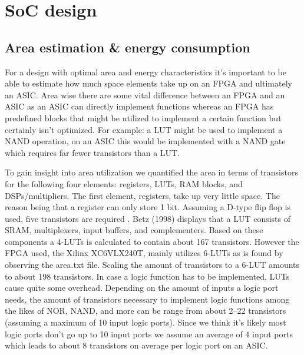 \section{SoC design}
\subsection{Area estimation \& energy consumption}
For a design with optimal area and energy characteristics it's important to be able to estimate how much space elements take up on an FPGA and ultimately an ASIC.
Area wise there are some vital difference between an FPGA and an ASIC as an ASIC can directly implement functions whereas an FPGA has predefined blocks that might be utilized to implement a certain function but certainly isn't optimized.
For example: a LUT might be used to implement a NAND operation, on an ASIC this would be implemented with a NAND gate which requires far fewer transistors than a LUT.


To gain insight into area utilization we quantified the area in terms of transistors for the following four elements: registers, LUTs, RAM blocks, and DSPs/multipliers.
The first element, registers, take up very little space.
The reason being that a register can only store \num{1} bit.
Assuming a D-type flip flop is used, five transistors are required \cite{Kumar Chakravarti}.
Betz (1998) displays that a LUT consists of SRAM, multiplexers, input buffers, and complementers.
Based on these components a 4-LUTs is calculated to contain about 167 transistors.
However the FPGA used, the Xilinx XC6VLX240T, mainly utilizes 6-LUTs as is found by observing the area.txt file.
Scaling the amount of transistors to a 6-LUT amounts to about 198 transistors.
In case a logic function has to be implemented, LUTs cause quite some overhead.
Depending on the amount of inputs a logic port needs, the amount of transistors necessary to implement logic functions among the likes of NOR, NAND, and more can be range from about \numrange{2}{22} transistors (assuming a maximum of \num{10} input logic ports).
Since we think it's likely most logic ports don't go up to 10 input ports we assume an average of 4 input ports which leads to about 8 transistors on average per logic port on an ASIC.


